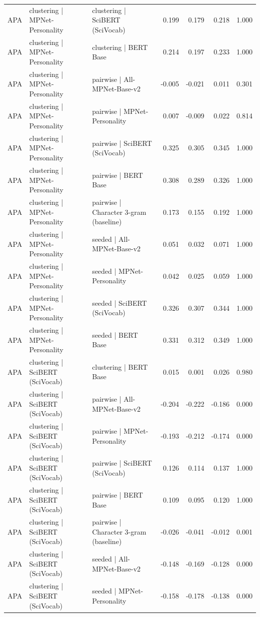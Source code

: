 \begin{table}[ht]
\begin{tabular}{lllrrrr}
APA & clustering | MPNet-Personality & clustering | SciBERT (SciVocab) & 0.199 & 0.179 & 0.218 & 1.000 \\
APA & clustering | MPNet-Personality & clustering | BERT Base & 0.214 & 0.197 & 0.233 & 1.000 \\
APA & clustering | MPNet-Personality & pairwise | All-MPNet-Base-v2 & -0.005 & -0.021 & 0.011 & 0.301 \\
APA & clustering | MPNet-Personality & pairwise | MPNet-Personality & 0.007 & -0.009 & 0.022 & 0.814 \\
APA & clustering | MPNet-Personality & pairwise | SciBERT (SciVocab) & 0.325 & 0.305 & 0.345 & 1.000 \\
APA & clustering | MPNet-Personality & pairwise | BERT Base & 0.308 & 0.289 & 0.326 & 1.000 \\
APA & clustering | MPNet-Personality & pairwise | Character 3-gram (baseline) & 0.173 & 0.155 & 0.192 & 1.000 \\
APA & clustering | MPNet-Personality & seeded | All-MPNet-Base-v2 & 0.051 & 0.032 & 0.071 & 1.000 \\
APA & clustering | MPNet-Personality & seeded | MPNet-Personality & 0.042 & 0.025 & 0.059 & 1.000 \\
APA & clustering | MPNet-Personality & seeded | SciBERT (SciVocab) & 0.326 & 0.307 & 0.344 & 1.000 \\
APA & clustering | MPNet-Personality & seeded | BERT Base & 0.331 & 0.312 & 0.349 & 1.000 \\
APA & clustering | SciBERT (SciVocab) & clustering | BERT Base & 0.015 & 0.001 & 0.026 & 0.980 \\
APA & clustering | SciBERT (SciVocab) & pairwise | All-MPNet-Base-v2 & -0.204 & -0.222 & -0.186 & 0.000 \\
APA & clustering | SciBERT (SciVocab) & pairwise | MPNet-Personality & -0.193 & -0.212 & -0.174 & 0.000 \\
APA & clustering | SciBERT (SciVocab) & pairwise | SciBERT (SciVocab) & 0.126 & 0.114 & 0.137 & 1.000 \\
APA & clustering | SciBERT (SciVocab) & pairwise | BERT Base & 0.109 & 0.095 & 0.120 & 1.000 \\
APA & clustering | SciBERT (SciVocab) & pairwise | Character 3-gram (baseline) & -0.026 & -0.041 & -0.012 & 0.001 \\
APA & clustering | SciBERT (SciVocab) & seeded | All-MPNet-Base-v2 & -0.148 & -0.169 & -0.128 & 0.000 \\
APA & clustering | SciBERT (SciVocab) & seeded | MPNet-Personality & -0.158 & -0.178 & -0.138 & 0.000 \\

\end{tabular}
\end{table}
